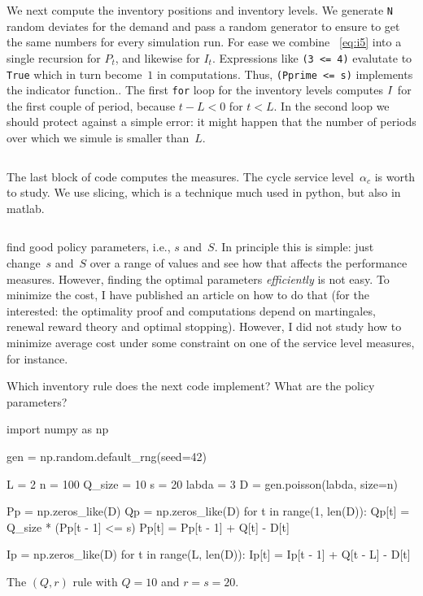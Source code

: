 \documentclass[stochastic-or.tex]{subfiles}
\begin{document}
We next compute the inventory positions and inventory levels.
We generate \texttt{N} random deviates for the demand and pass a random generator to ensure to get the same numbers for every simulation run.
For ease we combine ~\cref{eq:i5} into a single recursion for $P_t$, and likewise for $I_t$.
Expressions like \texttt{(3 <= 4)} evalutate to \texttt{True} which in turn become~$1$ in computations.
Thus, \texttt{(Pprime <= s)} implements the indicator function..
The first \texttt{for} loop for the inventory levels computes $I$ for the first couple of period, because $t-L< 0$ for $t< L$.
In the second loop we should protect against a simple error: it might happen that the number of periods over which we simule is smaller than~$L$.
\inputminted[firstline=23, lastline=40]{python}{../code/ss_inventory_simulation.py} %

The last block of code computes the measures.
The cycle service level~$\alpha_{c}$ is worth to study.
We use slicing, which is a technique  much used in python, but also in matlab.
\inputminted[firstline=44, lastline=57]{python}{../code/ss_inventory_simulation.py} %


 find good policy parameters, i.e., $s$ and~$S$.
In principle this is simple: just change~$s$ and~$S$ over a range of values and see how that affects the performance measures.
However, finding the optimal parameters \emph{efficiently} is not easy.
To minimize the cost, I have published an article on how to do that (for the interested: the optimality proof and computations depend on martingales, renewal reward theory and optimal stopping).
However, I did not study how to minimize average cost under some constraint on one of the service level measures, for instance.



\begin{exercise}
Which inventory rule does the next code implement? What are the policy parameters?
\begin{python}
import numpy as np

gen = np.random.default_rng(seed=42)

L = 2
n = 100
Q_size = 10
s = 20
labda = 3
D = gen.poisson(labda, size=n)

Pp = np.zeros_like(D)
Qp = np.zeros_like(D)
for t in range(1, len(D)):
    Qp[t] = Q_size * (Pp[t - 1] <= s)
    Pp[t] = Pp[t - 1] + Q[t] - D[t]

Ip = np.zeros_like(D)
for t in range(L, len(D)):
    Ip[t] = Ip[t - 1] + Q[t - L] - D[t]
\end{python}
\begin{solution}
The $(Q,r)$ rule with $Q=10$ and $r=s=20$.
\end{solution}
\end{exercise}




\end{document}
